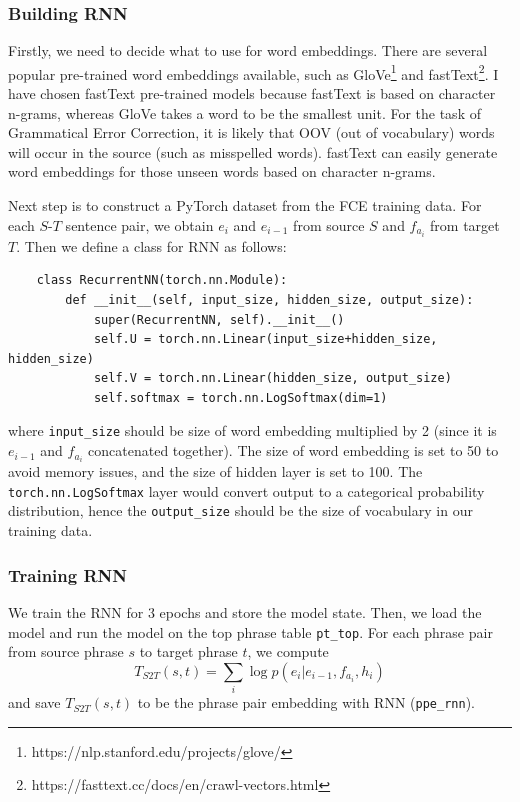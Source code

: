 \documentclass[12pt,a4paper,twoside,openright]{report}
\begin{document}
\subsubsection{Building RNN}
Firstly, we need to decide what to use for word embeddings. There are several popular pre-trained word embeddings available, such as GloVe\footnote{https://nlp.stanford.edu/projects/glove/} and fastText\footnote{https://fasttext.cc/docs/en/crawl-vectors.html}. I have chosen fastText pre-trained models because fastText is based on character n-grams, whereas GloVe takes a word to be the smallest unit. For the task of Grammatical Error Correction, it is likely that OOV (out of vocabulary) words will occur in the source (such as misspelled words). fastText can easily generate word embeddings for those unseen words based on character n-grams.

Next step is to construct a PyTorch dataset from the FCE training data. For each $S\textrm{-}T$ sentence pair, we obtain $e_i$ and $e_{i-1}$ from source $S$ and $f_{a_i}$ from target $T$. Then we define a class for RNN as follows:

\begin{verbatim}
    class RecurrentNN(torch.nn.Module):
        def __init__(self, input_size, hidden_size, output_size):
            super(RecurrentNN, self).__init__()
            self.U = torch.nn.Linear(input_size+hidden_size, hidden_size)
            self.V = torch.nn.Linear(hidden_size, output_size)
            self.softmax = torch.nn.LogSoftmax(dim=1)
\end{verbatim}

where \texttt{input\_size} should be size of word embedding multiplied by 2 (since it is $e_{i-1}$ and $f_{a_i}$ concatenated together). The size of word embedding is set to 50 to avoid memory issues, and the size of hidden layer is set to 100. The \texttt{torch.nn.LogSoftmax} layer would convert output to a categorical probability distribution, hence the \texttt{output\_size} should be the size of vocabulary in our training data.

\subsubsection{Training RNN}
We train the RNN for 3 epochs and store the model state. Then, we load the model and run the model on the top phrase table \texttt{pt\_top}. For each phrase pair from source phrase $s$ to target phrase $t$, we compute 
\[ T_{S2T}(s, t) = \sum_{i} \log p(e_i|e_{i-1}, f_{a_i}, h_i)\]
and save $T_{S2T}(s, t)$ to be the phrase pair embedding with RNN (\texttt{ppe\_rnn}). 
\end{document}
